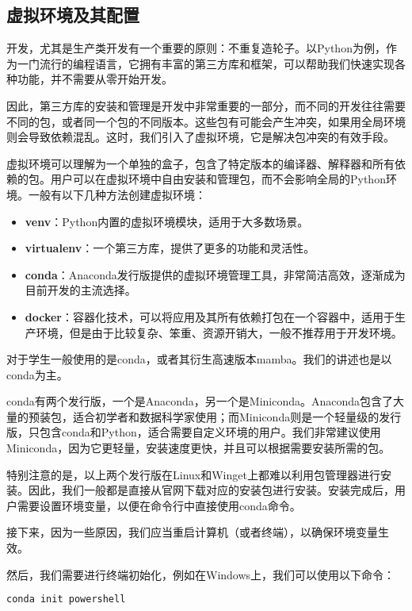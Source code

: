 \documentclass[../main.tex]{subfiles}
\begin{document}
\subsection{虚拟环境及其配置}

开发，尤其是生产类开发有一个重要的原则：不重复造轮子。以Python为例，作为一门流行的编程语言，它拥有丰富的第三方库和框架，可以帮助我们快速实现各种功能，并不需要从零开始开发。

因此，第三方库的安装和管理是开发中非常重要的一部分，而不同的开发往往需要不同的包，或者同一个包的不同版本。这些包有可能会产生冲突，如果用全局环境则会导致依赖混乱。这时，我们引入了虚拟环境，它是解决包冲突的有效手段。

虚拟环境可以理解为一个单独的盒子，包含了特定版本的编译器、解释器和所有依赖的包。用户可以在虚拟环境中自由安装和管理包，而不会影响全局的Python环境。一般有以下几种方法创建虚拟环境：
\begin{itemize}
  \item \textbf{venv}：Python内置的虚拟环境模块，适用于大多数场景。
  \item \textbf{virtualenv}：一个第三方库，提供了更多的功能和灵活性。
  \item \textbf{conda}：Anaconda发行版提供的虚拟环境管理工具，非常简洁高效，逐渐成为目前开发的主流选择。
  \item \textbf{docker}：容器化技术，可以将应用及其所有依赖打包在一个容器中，适用于生产环境，但是由于比较复杂、笨重、资源开销大，一般不推荐用于开发环境。
\end{itemize}

对于学生一般使用的是conda，或者其衍生高速版本mamba。我们的讲述也是以conda为主。

conda有两个发行版，一个是Anaconda，另一个是Miniconda。Anaconda包含了大量的预装包，适合初学者和数据科学家使用；而Miniconda则是一个轻量级的发行版，只包含conda和Python，适合需要自定义环境的用户。我们非常建议使用Miniconda，因为它更轻量，安装速度更快，并且可以根据需要安装所需的包。

特别注意的是，以上两个发行版在Linux和Winget上都难以利用包管理器进行安装。因此，我们一般都是直接从官网下载对应的安装包进行安装。安装完成后，用户需要设置环境变量，以便在命令行中直接使用conda命令。

接下来，因为一些原因，我们应当重启计算机（或者终端），以确保环境变量生效。

然后，我们需要进行终端初始化，例如在Windows上，我们可以使用以下命令：
\begin{lstlisting}[language=bash]
    conda init powershell
\end{lstlisting}
\end{document}
